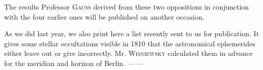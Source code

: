 \par\indent The results Professor \textsc{Gauss} derived from these two oppositions in conjunction with the four earlier ones will be published on another occasion.

As we did last year, we also print here a list recently sent to us for publication. It gives some stellar occultations visible in 1810 that the astronomical ephemerides either leave out or give incorrectly. Mr. \textsc{Wisniewsky} calculated them in advance for the meridian and horizon of Berlin. --- ---
